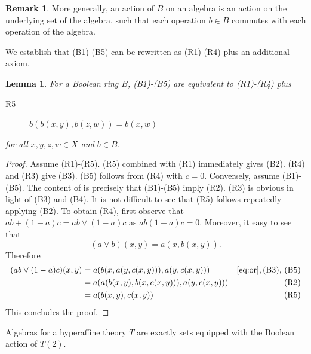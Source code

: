 \documentclass{amsart}
\numberwithin{equation}{section}
\theoremstyle{plain}
\newtheorem{lemma}[theorem]{Lemma}
\theoremstyle{definition}
\newtheorem{remark}[theorem]{Remark}
\begin{document}
\begin{remark}
  \label{rem:balgebra}
  More generally, an action of $B$ on an algebra is an action on the underlying set of the algebra, such that each operation $b \in B$ commutes with each operation of the algebra.
\end{remark}

We establish that (B1)-(B5) can be rewritten as (R1)-(R4) plus an additional axiom. 

\begin{lemma}
  \label{lem:rtob}
    For a Boolean ring $B$, \emph{(B1)-(B5)} are equivalent to \emph{(R1)-(R4)} plus
    \begin{description}
        \item[R5] $b(b(x,y), b(z,w)) = b(x,w)$
    \end{description} 
    for all $x,y,z,w \in X$ and $b\in B$. 
\end{lemma}
    \begin{proof}
        Assume (R1)-(R5). 
        (R5) combined with (R1) immediately gives (B2).  
        (R4) and (R3) give (B3). 
        (B5) follows from (R4) with $c=0$.   
        Conversely, assume (B1)-(B5). 
        The content of \cite[Proposition 11]{B91} is precisely that (B1)-(B5) imply (R2). 
        (R3) is obvious in light of (B3) and (B4). 
        It is not difficult to see that (R5) follows repeatedly applying (B2). 
        To obtain (R4), first observe that $ab+(1-a)c = ab \lor (1-a)c$ as $ab(1-a)c=0$. 
        Moreover, it easy to see that 
        \begin{equation}
          \label{eq:or}
          (a \lor b)(x,y) = a(x,b(x,y)) \text{.}
        \end{equation}
        Therefore  
        \begin{align*}
          (ab \lor (1-a)c)(x,y) & = a(b(x,a(y,c(x,y))),a(y,c(x,y))) & \eqref{eq:or}, \text{(B3), (B5)} \\
          & = a(a(b(x,y),b(x,c(x,y))),a(y,c(x,y))) & \text{ (R2)} \\
          & = a(b(x,y), c(x,y)) & \text{ (R5)}
        \end{align*}
        This concludes the proof. 
\end{proof}

Algebras for a hyperaffine theory $T$ are exactly sets equipped with the Boolean action of $T(2)$.
\end{document}
